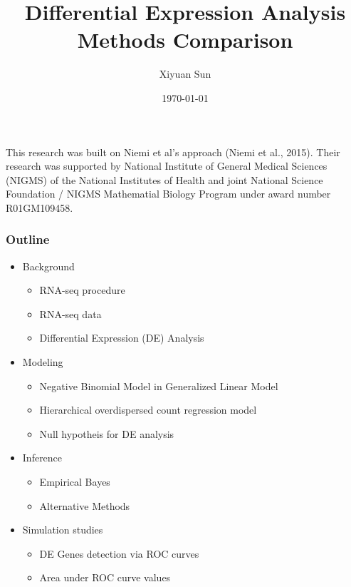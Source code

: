 \documentclass[handout,10pt]{beamer}
\institute[ISU]{Iowa State University}
\date{\today}
\title[Empirical Bayesian Method vs. Other Methods]{Differential Expression Analysis Methods Comparison}
\author{Xiyuan Sun}
\begin{document}


\begin{frame}
\maketitle

\pause

\vspace{0.2in} \pause

{\tiny
This research was built on Niemi et al's approach (Niemi et al., 2015). Their research was supported by National Institute of General Medical Sciences (NIGMS) of the National Institutes of Health and joint National Science Foundation / NIGMS Mathematial Biology Program under award number R01GM109458. 
}

\end{frame}





\begin{frame}
\frametitle{Outline}

\begin{itemize}
\item Background
	\begin{itemize}
	\item RNA-seq procedure
	\item RNA-seq data
	\item Differential Expression (DE) Analysis
	\end{itemize}
\item Modeling 
	\begin{itemize}
	\item Negative Binomial Model in Generalized Linear Model 
	\item Hierarchical overdispersed count regression model 
	\item Null hypotheis for DE analysis
	\end{itemize}
\item Inference
	\begin{itemize}
	\item Empirical Bayes
	\item Alternative Methods
	\end{itemize}
\item Simulation studies
	\begin{itemize}
	\item DE Genes detection via ROC curves
	\item Area under ROC curve values
	\end{itemize}
\end{itemize}

\end{frame}
\end{document}
